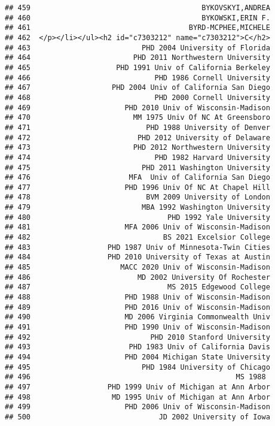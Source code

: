 \documentclass[
]{article}
\begin{document}
\begin{verbatim}
## 459                                        BYKOVSKYI,ANDREA
## 460                                        BYKOWSKI,ERIN F.
## 461                                     BYRD-MCPHEE,MICHELE
## 462  </p></li></ul><h2 id="c7303212" name="c7303212">C</h2>
## 463                          PHD 2004 University of Florida
## 464                        PHD 2011 Northwestern University
## 465                    PHD 1991 Univ of California Berkeley
## 466                             PHD 1986 Cornell University
## 467                   PHD 2004 Univ of California San Diego
## 468                             PHD 2000 Cornell University
## 469                      PHD 2010 Univ of Wisconsin-Madison
## 470                        MM 1975 Univ Of NC At Greensboro
## 471                           PHD 1988 University of Denver
## 472                         PHD 2012 University of Delaware
## 473                        PHD 2012 Northwestern University
## 474                             PHD 1982 Harvard University
## 475                          PHD 2011 Washington University
## 476                       MFA  Univ of California San Diego
## 477                      PHD 1996 Univ Of NC At Chapel Hill
## 478                           BVM 2009 University of London
## 479                          MBA 1992 Washington University
## 480                                PHD 1992 Yale University
## 481                      MFA 2006 Univ of Wisconsin-Madison
## 482                               BS 2021 Excelsior College
## 483                  PHD 1987 Univ of Minnesota-Twin Cities
## 484                  PHD 2010 University of Texas at Austin
## 485                     MACC 2020 Univ of Wisconsin-Madison
## 486                         MD 2002 University Of Rochester
## 487                                MS 2015 Edgewood College
## 488                      PHD 1988 Univ of Wisconsin-Madison
## 489                      PHD 2016 Univ of Wisconsin-Madison
## 490                      MD 2006 Virginia Commonwealth Univ
## 491                      PHD 1990 Univ of Wisconsin-Madison
## 492                            PHD 2010 Stanford University
## 493                       PHD 1983 Univ of California Davis
## 494                      PHD 2004 Michigan State University
## 495                          PHD 1984 University of Chicago
## 496                                                MS 1988 
## 497                  PHD 1999 Univ of Michigan at Ann Arbor
## 498                   MD 1995 Univ of Michigan at Ann Arbor
## 499                      PHD 2006 Univ of Wisconsin-Madison
## 500                              JD 2002 University of Iowa

\end{verbatim}
\end{document}
